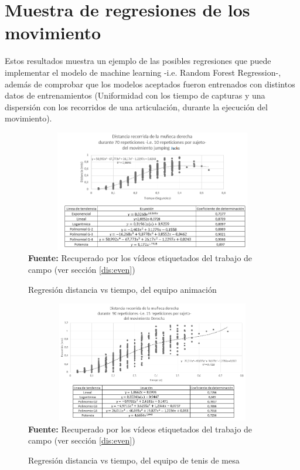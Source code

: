 \section{Muestra de regresiones de los movimiento} \label{res:regretions}
Estos resultados muestra un ejemplo de las posibles regresiones que puede implementar el modelo de machine learning -i.e. Random Forest Regression-, adem\'as de comprobar que los modelos aceptados fueron entrenados con distintos datos de entrenamientos (Uniformidad con los tiempo de capturas y una dispersi\'on con los recorridos de una articulaci\'on, durante la ejecuci\'on del  movimiento).
\begin{figure}[H]
	\caption{Regresi\'on distancia vs tiempo, del equipo animaci\'on}
	\label{fig:regrCheerleader}
	\centering
	\includegraphics[width=445px,height=200px]{graphics/resultados/cluster-cheerleaders.PNG} \\
	\textbf{Fuente:} Recuperado por los v\'ideos etiquetados del trabajo de campo (ver secci\'on \ref{dis:even})
\end{figure}
\begin{figure}[H]
	\caption{Regresi\'on distancia vs tiempo, del equipo de tenis de mesa}
	\label{fig:regrTennisDeMesa}
	\centering
	\includegraphics[width=445px,height=200px]{graphics/resultados/cluster-tennis.PNG} \\
	\textbf{Fuente:} Recuperado por los v\'ideos etiquetados del trabajo de campo (ver secci\'on \ref{dis:even})
\end{figure}

